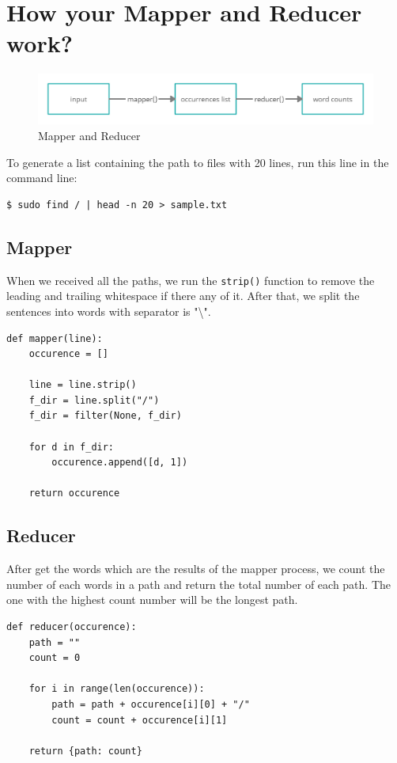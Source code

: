 \documentclass[times, 10pt]{thesisMDH}
\begin{document}
\titlePage

\newpage

\mainmatter

\section{How your Mapper and Reducer work?}
\begin{figure}[H]
    \centering
    \includegraphics[width=1\linewidth]{images/4-1.png}
    \caption{Mapper and Reducer}
    \label{fig:my_label}
\end{figure}
To generate a list containing the path to files with 20 lines, run this line in the command line:
\begin{lstlisting}
$ sudo find / | head -n 20 > sample.txt
\end{lstlisting}
\subsection{Mapper}
When we received all the paths, we run the \verb|strip()| function to remove the leading and trailing whitespace if there any of it. After that, we split the sentences into words with separator is "\backslash".

\begin{lstlisting}
def mapper(line):
	occurence = []

	line = line.strip()
	f_dir = line.split("/")
	f_dir = filter(None, f_dir)
				
	for d in f_dir:
		occurence.append([d, 1])

	return occurence
\end{lstlisting}
\subsection{Reducer}
After get the words which are the results of the mapper process, we count the number of each words in a path and return the total number of each path. The one with the highest count number will be the longest path.
\begin{lstlisting}
def reducer(occurence):
	path = ""
	count = 0

	for i in range(len(occurence)):
		path = path + occurence[i][0] + "/"
		count = count + occurence[i][1]

	return {path: count}
\end{lstlisting}
\end{document}
